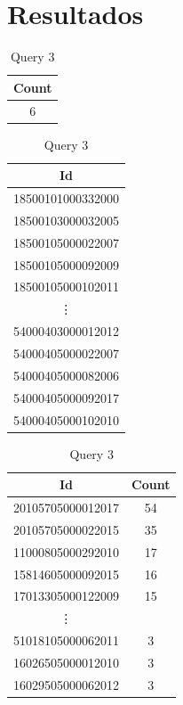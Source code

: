 \documentclass{article}
\begin{document}
\section{Resultados}
\begin{table}[H]
  \begin{minipage}{.1\linewidth}
    \centering
    \begin{tabular}{c}
      {Count} \\
      \midrule
      6 \\
      \bottomrule
    \end{tabular}
    \caption*{Query 1}
  \end{minipage}
  \begin{minipage}{.29\linewidth}
    \centering
    \begin{tabular}{c}
      Id \\
      \midrule
      18500101000332000 \\
      18500103000032005 \\
      18500105000022007 \\
      18500105000092009 \\
      18500105000102011 \\
      \vdots \\
      54000403000012012 \\
      54000405000022007 \\
      54000405000082006 \\
      54000405000092017 \\
      54000405000102010 \\
      \bottomrule
    \end{tabular}
    \caption*{Query 3}
  \end{minipage}
  \begin{minipage}{.29\linewidth}
    \centering
    \begin{tabular}{cc}
      Id & Count \\
      \midrule
      20105705000012017 & 54 \\
      20105705000022015 & 35 \\
      11000805000292010 & 17 \\
      15814605000092015 & 16 \\
      17013305000122009 & 15 \\
      \vdots \\
      51018105000062011 & 3 \\
      16026505000012010 & 3 \\
      16029505000062012 & 3 \\

\end{tabular}
\end{minipage}
\end{table}
\end{document}
